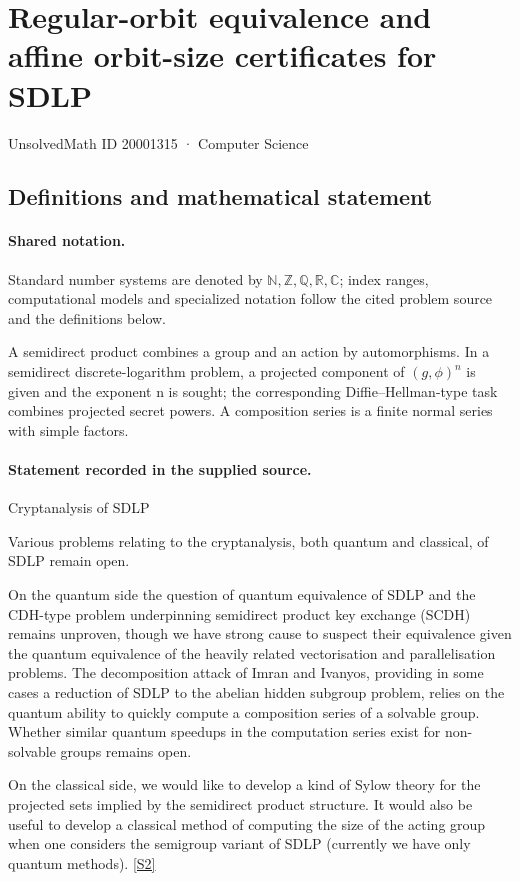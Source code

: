 \documentclass[11pt]{article}
\newcommand{\sref}[2]{\hyperlink{source:#1:#2}{[S#2]}}
\begin{document}
\setcounter{section}{20001314}
\section{Regular-orbit equivalence and affine orbit-size certificates for SDLP}\label{20001315}
{\small\sffamily UnsolvedMath ID 20001315 · Computer Science}
\subsection{Definitions and mathematical statement}

\paragraph{Shared notation.}Standard number systems are denoted by $\mathbb N,\mathbb Z,\mathbb Q,\mathbb R,\mathbb C$; index ranges, computational models and specialized notation follow the cited problem source and the definitions below.


A semidirect product combines a group and an action by automorphisms. In a semidirect discrete-logarithm problem, a projected component of $(g,\phi)^n$ is given and the exponent n is sought; the corresponding Diffie--Hellman-type task combines projected secret powers. A composition series is a finite normal series with simple factors.
\paragraph{Statement recorded in the supplied source.}
Cryptanalysis of SDLP

Various problems relating to the cryptanalysis, both quantum and classical, of SDLP remain open.

On the quantum side the question of quantum equivalence of SDLP and the CDH-type problem underpinning semidirect product key exchange (SCDH) remains unproven, though we have strong cause to suspect their equivalence given the quantum equivalence of the heavily related vectorisation and parallelisation problems. The decomposition attack of Imran and Ivanyos, providing in some cases a reduction of SDLP to the abelian hidden subgroup problem, relies on the quantum ability to quickly compute a composition series of a solvable group. Whether similar quantum speedups in the computation series exist for non-solvable groups remains open.

On the classical side, we would like to develop a kind of Sylow theory for the projected sets implied by the semidirect product structure. It would also be useful to develop a classical method of computing the size of the acting group when one considers the semigroup variant of SDLP (currently we have only quantum methods). \sref{20001315}{2}
\end{document}
